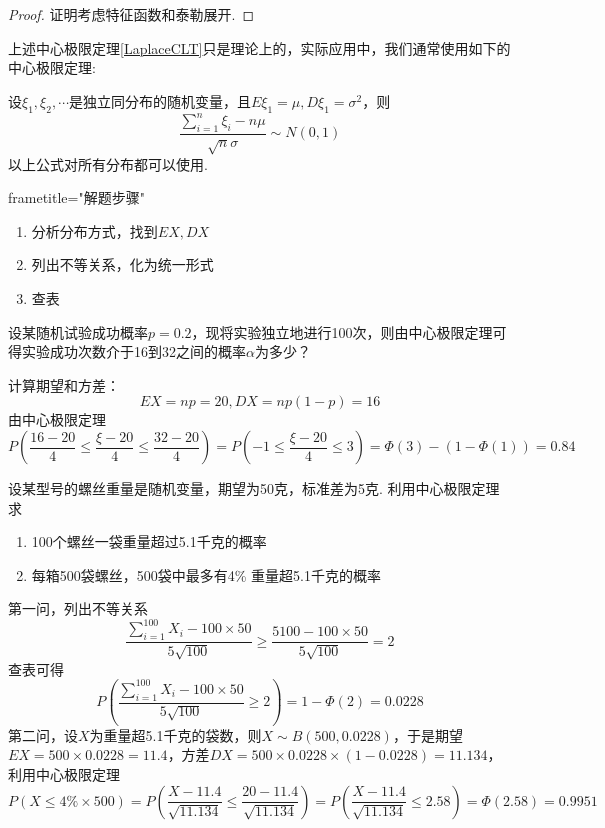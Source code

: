 \begin{proof}
    证明考虑特征函数和泰勒展开.
\end{proof}
上述中心极限定理\ref{LaplaceCLT}只是理论上的，实际应用中，我们通常使用如下的中心极限定理:
\begin{theorem}[中心极限定理]
    设$\xi_1,\xi_2,\cdots$是独立同分布的随机变量，且$E\xi_1=\mu,D\xi_1=\sigma^2$，则
    \[
        \frac{\sum_{i=1}^n \xi_i-n\mu}{\sqrt{n}\sigma}\sim N(0,1)
    \]
    以上公式对所有分布都可以使用.
\end{theorem}
\begin{kaobox}{frametitle="解题步骤"}
    \begin{enumerate}
        \item 分析分布方式，找到$EX,DX$
        \item 列出不等关系，化为统一形式
        \item 查表
    \end{enumerate}
\end{kaobox}
\begin{example}
    设某随机试验成功概率$p=0.2$，现将实验独立地进行100次，则由中心极限定理可得实验成功次数介于16到32之间的概率$\alpha$为多少？
\end{example}
\begin{solution}
    计算期望和方差：
    \[
        EX=np=20,DX=np(1-p)=16
    \]
    由中心极限定理
    \[
        P(\frac{16-20}{4}\leq \frac{\xi-20}{4}\leq \frac{32-20}{4})=P(-1\leq \frac{\xi-20}{4}\leq 3)=\Phi(3)-(1-\Phi(1))=0.84
    \]
\end{solution}

\begin{example}
    设某型号的螺丝重量是随机变量，期望为50克，标准差为5克. 利用中心极限定理求
    \begin{enumerate}
        \item 100个螺丝一袋重量超过5.1千克的概率
        \item 每箱500袋螺丝，500袋中最多有4\% 重量超5.1千克的概率 
    \end{enumerate}
\end{example}
\begin{solution}
    第一问，列出不等关系
    \[
      \frac{\sum_{i=1}^{100}X_i-100\times 50}{5\sqrt{100}}\ge \frac{5100-100\times 50}{5\sqrt{100}}=2
    \]
    查表可得
    \[
        P(\frac{\sum_{i=1}^{100}X_i-100\times 50}{5\sqrt{100}}\ge 2)=1-\Phi(2)=0.0228
    \]
    第二问，设$X$为重量超5.1千克的袋数，则$X\sim B(500,0.0228)$，于是期望$EX=500\times 0.0228=11.4$，方差$DX=500\times 0.0228\times (1-0.0228)=11.134$，利用中心极限定理
    \[
        P(X\le 4\%\times 500)=P(\frac{X-11.4}{\sqrt{11.134}}\le \frac{20-11.4}{\sqrt{11.134}})=P(\frac{X-11.4}{\sqrt{11.134}}\le 2.58)=\Phi(2.58)=0.9951
    \]
\end{solution}




